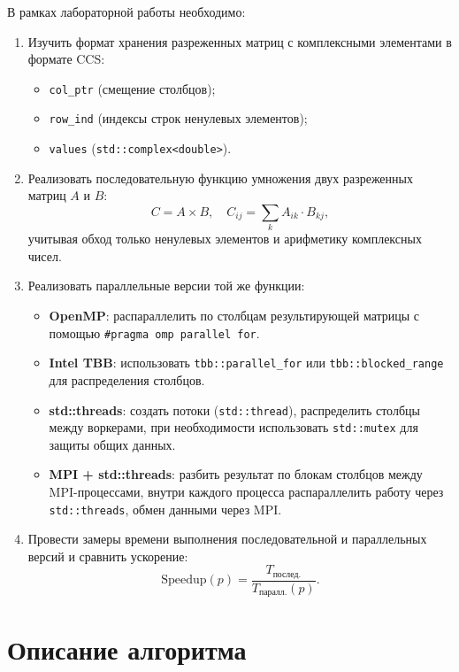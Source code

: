 \documentclass[12pt]{article}
\begin{document}
В рамках лабораторной работы необходимо:
\begin{enumerate}
    \item Изучить формат хранения разреженных матриц с комплексными элементами в формате CCS:
    \begin{itemize}
        \item \texttt{col\_ptr} (смещение столбцов);
        \item \texttt{row\_ind} (индексы строк ненулевых элементов);
        \item \texttt{values} (\texttt{std::complex<double>}).
    \end{itemize}

    \item Реализовать последовательную функцию умножения двух разреженных матриц \(A\) и \(B\):
    \[
        C = A \times B, \quad C_{ij} = \sum_{k} A_{ik} \cdot B_{kj},
    \]
    учитывая обход только ненулевых элементов и арифметику комплексных чисел.

    \item Реализовать параллельные версии той же функции:
    \begin{itemize}
        \item \textbf{OpenMP}: распараллелить по столбцам результирующей матрицы с помощью \texttt{\#pragma omp parallel for}.
        \item \textbf{Intel TBB}: использовать \texttt{tbb::parallel\_for} или \texttt{tbb::blocked\_range} для распределения столбцов.
        \item \textbf{std::threads}: создать потоки (\texttt{std::thread}), распределить столбцы между воркерами, при необходимости использовать \texttt{std::mutex} для защиты общих данных.
        \item \textbf{MPI + std::threads}: разбить результат по блокам столбцов между MPI-процессами, внутри каждого процесса распараллелить работу через \texttt{std::threads}, обмен данными через MPI.
    \end{itemize}

    \item Провести замеры времени выполнения последовательной и параллельных версий и сравнить ускорение:
    \[
        \text{Speedup}(p) = \frac{T_{\text{послед.}}}{T_{\text{паралл.}}(p)}.
    \]
\end{enumerate}

\section{Описание алгоритма}
\end{document}
